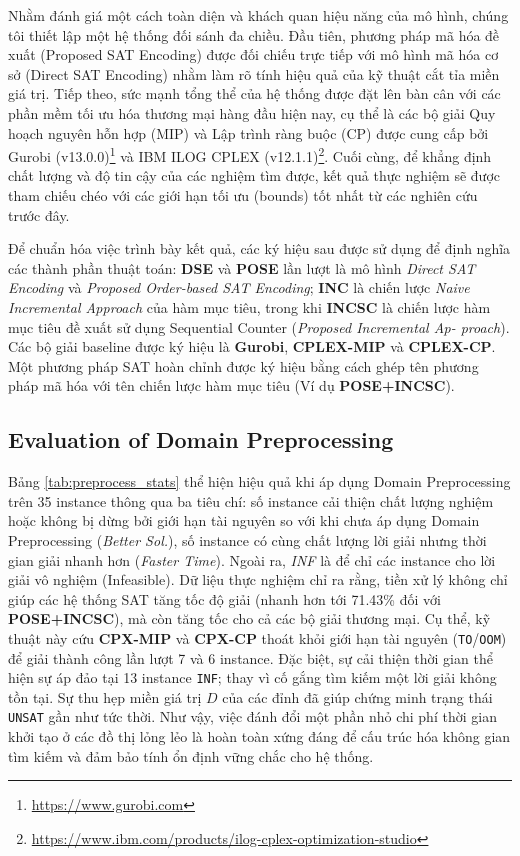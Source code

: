 \documentclass[letterpaper,journal]{IEEEtran}
\begin{document}
Nhằm đánh giá một cách toàn diện và khách quan hiệu năng của mô hình, chúng tôi thiết lập một hệ thống đối sánh đa chiều. Đầu tiên, phương pháp mã hóa đề xuất (Proposed SAT Encoding) được đối chiếu trực tiếp với mô hình mã hóa cơ sở (Direct SAT Encoding) nhằm làm rõ tính hiệu quả của kỹ thuật cắt tỉa miền giá trị. Tiếp theo, sức mạnh tổng thể của hệ thống được đặt lên bàn cân với các phần mềm tối ưu hóa thương mại hàng đầu hiện nay, cụ thể là các bộ giải Quy hoạch nguyên hỗn hợp (MIP)\cite{} và Lập trình ràng buộc (CP)\cite{} được cung cấp bởi Gurobi (v13.0.0)\footnote{\url{https://www.gurobi.com}} và IBM ILOG CPLEX (v12.1.1)\footnote{\url{https://www.ibm.com/products/ilog-cplex-optimization-studio}}. Cuối cùng, để khẳng định chất lượng và độ tin cậy của các nghiệm tìm được, kết quả thực nghiệm sẽ được tham chiếu chéo với các giới hạn tối ưu (bounds) tốt nhất từ các nghiên cứu trước đây.

Để chuẩn hóa việc trình bày kết quả, các ký hiệu sau được sử dụng để định nghĩa các thành phần thuật toán: \textbf{DSE} và \textbf{POSE} lần lượt là mô hình \textit{Direct SAT Encoding} và \textit{Proposed Order-based SAT Encoding}; \textbf{INC} là chiến lược \textit{Naive Incremental Approach} của hàm mục tiêu, trong khi \textbf{INCSC} là chiến lược hàm mục tiêu đề xuất sử dụng Sequential Counter (\textit{Proposed Incremental Ap-
proach}). Các bộ giải baseline được ký hiệu là \textbf{Gurobi}, \textbf{CPLEX-MIP} và \textbf{CPLEX-CP}. 
Một phương pháp SAT hoàn chỉnh được ký hiệu bằng cách ghép tên phương pháp mã hóa với tên chiến lược hàm mục tiêu (Ví dụ \textbf{POSE+INCSC}).

\subsection{Evaluation of Domain Preprocessing}

Bảng \ref{tab:preprocess_stats} thể hiện hiệu quả khi áp dụng Domain Preprocessing trên 35 instance thông qua ba tiêu chí: số instance cải thiện chất lượng nghiệm hoặc không bị dừng bởi giới hạn tài nguyên so với khi chưa áp dụng Domain Preprocessing (\textit{Better Sol.}), số instance có cùng chất lượng lời giải nhưng thời gian giải nhanh hơn  (\textit{Faster Time}). Ngoài ra, \textit{INF} là để chỉ các instance cho lời giải vô nghiệm (Infeasible). Dữ liệu thực nghiệm chỉ ra rằng, tiền xử lý không chỉ giúp các hệ thống SAT tăng tốc độ giải (nhanh hơn tới 71.43\% đối với \textbf{POSE+INCSC}), mà còn tăng tốc cho cả các bộ giải thương mại. Cụ thể, kỹ thuật này cứu \textbf{CPX-MIP} và \textbf{CPX-CP} thoát khỏi giới hạn tài nguyên (\texttt{TO}/\texttt{OOM}) để giải thành công lần lượt 7 và 6 instance. Đặc biệt, sự cải thiện thời gian thể hiện sự áp đảo tại 13 instance \texttt{INF}; thay vì cố gắng tìm kiếm một lời giải không tồn tại. Sự thu hẹp miền giá trị $D$ của các đỉnh đã giúp chứng minh trạng thái \texttt{UNSAT} gần như tức thời. Như vậy, việc đánh đổi một phần nhỏ chi phí thời gian khởi tạo ở các đồ thị lỏng lẻo là hoàn toàn xứng đáng để cấu trúc hóa không gian tìm kiếm và đảm bảo tính ổn định vững chắc cho hệ thống.
\end{document}
